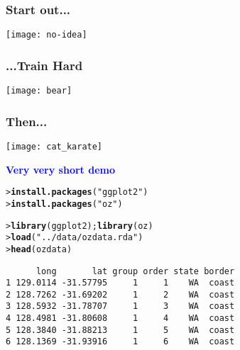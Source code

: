 \documentclass[13pt,aspectratio=169]{beamer}\usepackage[]{graphicx}\usepackage[]{color}
\makeatletter
\newcommand{\hlstr}[1]{\textcolor[rgb]{0.192,0.494,0.8}{#1}}%
\newcommand{\hlstd}[1]{\textcolor[rgb]{0.345,0.345,0.345}{#1}}%
\newcommand{\hlkwd}[1]{\textcolor[rgb]{0.737,0.353,0.396}{\textbf{#1}}}%
\newenvironment{kframe}{%
 \def\at@end@of@kframe{}%
 \ifinner\ifhmode%
  \def\at@end@of@kframe{\end{minipage}}%
  \begin{minipage}{\columnwidth}%
 \fi\fi%
 \def\FrameCommand##1{\hskip\@totalleftmargin \hskip-\fboxsep
 \colorbox{shadecolor}{##1}\hskip-\fboxsep
     \hskip-\linewidth \hskip-\@totalleftmargin \hskip\columnwidth}%
 \MakeFramed {\advance\hsize-\width
   \@totalleftmargin\z@ \linewidth\hsize
   \@setminipage}}%
 {\par\unskip\endMakeFramed%
 \at@end@of@kframe}
\newenvironment{knitrout}{}{} %
\newcommand{\tc}[2]{\textcolor{#1}{#2}}
\renewenvironment{knitrout}{\setlength{\topsep}{0mm}}{}
\makeatother
\begin{document}
\begin{frame}
    \frametitle{Start out...}
    \begin{center}
	\texttt{[image: no-idea]}
    \end{center}
\end{frame}

\begin{frame}
    \frametitle{...Train Hard}
    \texttt{[image: bear]}
\end{frame}

\begin{frame}
    \frametitle{Then...}
    \texttt{[image: cat\_karate]}
\end{frame}

\begin{frame}
    \begin{center}
	\tc{Blue}{\textbf{\Huge{Very very short demo}}}
    \end{center}
\end{frame}

\begin{frame}[fragile]
\begin{knitrout}\small
{}\color{fgcolor}\begin{kframe}
\begin{alltt}
\hlstd{> }\hlkwd{install.packages}\hlstd{(}\hlstr{"ggplot2"}\hlstd{)}
\hlstd{> }\hlkwd{install.packages}\hlstd{(}\hlstr{"oz"}\hlstd{)}
\end{alltt}
\end{kframe}
\end{knitrout}

\begin{knitrout}\small
{}\color{fgcolor}\begin{kframe}
\begin{alltt}
\hlstd{> }\hlkwd{library}\hlstd{(ggplot2);} \hlkwd{library}\hlstd{(oz)}
\hlstd{> }\hlkwd{load}\hlstd{(}\hlstr{"../data/ozdata.rda"}\hlstd{)}
\hlstd{> }\hlkwd{head}\hlstd{(ozdata)}
\end{alltt}
\begin{verbatim}
      long       lat group order state border
1 129.0114 -31.57795     1     1    WA  coast
2 128.7262 -31.69202     1     2    WA  coast
3 128.5932 -31.78707     1     3    WA  coast
4 128.4981 -31.80608     1     4    WA  coast
5 128.3840 -31.88213     1     5    WA  coast
6 128.1369 -31.93916     1     6    WA  coast
\end{verbatim}
\end{kframe}
\end{knitrout}
\end{frame}
\end{document}
